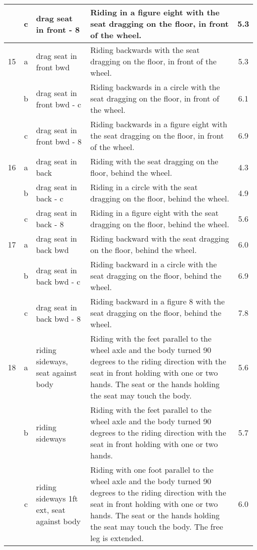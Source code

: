 \begin{longtable}{|r|c|p{4cm}|p{8cm}|c|}
\hline
  & c & drag seat in front - 8  & Riding in a figure eight with the seat dragging on the floor, in front of the wheel.  & 5.3 \\ 
\hline
15  & a & drag seat in front bwd  & Riding backwards with the seat dragging on the floor, in front of the wheel.  & 5.3 \\ 
\hline
  & b & drag seat in front bwd - c  & Riding backwards in a circle with the seat dragging on the floor, in front of the wheel.  & 6.1 \\ 
\hline
  & c & drag seat in front bwd - 8  & Riding backwards in a figure eight with the seat dragging on the floor, in front of the wheel.  & 6.9 \\ 
\hline
16  & a & drag seat in back & Riding with the seat dragging on the floor, behind the wheel. & 4.3 \\ 
\hline
  & b & drag seat in back - c & Riding in a circle with the seat dragging on the floor, behind the wheel. & 4.9 \\ 
\hline
  & c & drag seat in back - 8 & Riding in a figure eight with the seat dragging on the floor, behind the wheel. & 5.6 \\ 
\hline
17  & a & drag seat in back bwd & Riding backward with the seat dragging on the floor, behind the wheel.  & 6.0 \\ 
\hline
  & b & drag seat in back bwd - c & Riding backward in a circle with the seat dragging on the floor, behind the wheel.  & 6.9 \\ 
\hline
  & c & drag seat in back bwd - 8 & Riding backward in a figure 8 with the seat dragging on the floor, behind the wheel.  & 7.8 \\ 
\hline
18  & a & riding sideways, seat against body  & Riding with the feet parallel to the wheel axle and the body turned 90 degrees to the riding direction with the seat in front holding with one or two hands. The seat or the hands holding the seat may touch the body. & 5.6 \\ 
\hline
  & b & riding sideways & Riding with the feet parallel to the wheel axle and the body turned 90 degrees to the riding direction with the seat in front holding with one or two hands.  & 5.7 \\ 
\hline
  & c & riding sideways 1ft ext, seat against body  & Riding with one foot parallel to the wheel axle and the body turned 90 degrees to the riding direction with the seat in front holding with one or two hands. The seat or the hands holding the seat may touch the body. The free leg is extended. & 6.0 \\ 

\end{longtable}
